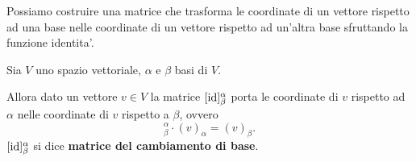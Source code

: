 Possiamo costruire una matrice che trasforma le coordinate di un vettore rispetto ad una base nelle coordinate di un vettore rispetto ad un'altra base sfruttando la funzione identita'.

\begin{definition}
    Sia $V$ uno spazio vettoriale, $\alpha$ e $\beta$ basi di $V$. 
    
    Allora dato un vettore $v \in V$ la matrice $[\operatorname{id}]^{\alpha}_{\beta}$ porta le coordinate di $v$ rispetto ad $\alpha$ nelle coordinate di $v$ rispetto a $\beta$, ovvero \begin{equation}
        [\id]^{\alpha}_{\beta} \cdot (v)_{\alpha} = (v)_{\beta}.
    \end{equation}
    $[\operatorname{id}]^{\alpha}_{\beta}$ si dice \textbf{matrice del cambiamento di base}.
\end{definition}
